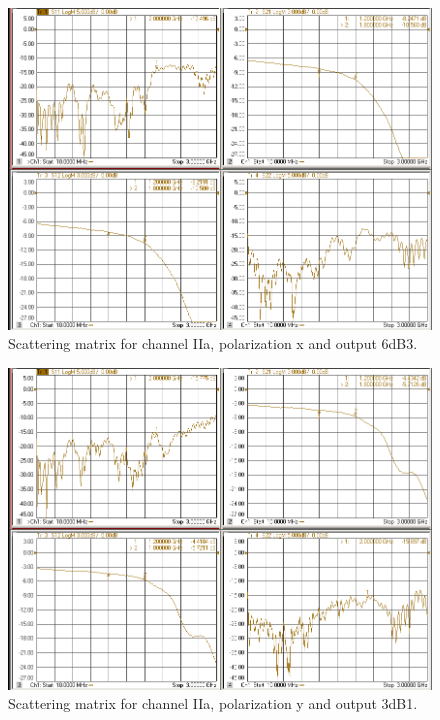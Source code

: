 \documentclass[12pt,a4paper,oneside]{article}
\begin{document}
\begin{figure}[H]
\centering
\includegraphics[width=0.9\linewidth]{VNA_results/IIax_6dB3.png}
\caption{Scattering matrix for channel IIa, polarization x and output 6dB3.}
\label{fig:IIax_6dB3}
\end{figure}


\begin{figure}[H]
\centering
\includegraphics[width=0.9\linewidth]{VNA_results/IIay_3dB1.png}
\caption{Scattering matrix for channel IIa, polarization y and output 3dB1.}
\label{fig:IIay_3dB1}
\end{figure}
\end{document}
